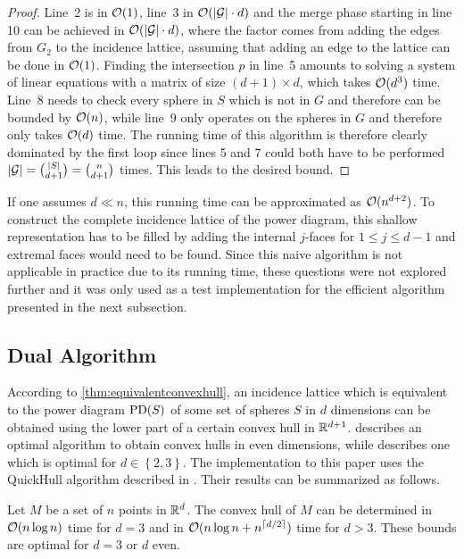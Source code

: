 \begin{proof}
    Line~2 is in $\mathcal{O}(1)$, line~3 in $\mathcal{O}(\left\vert \mathcal{G} \right\vert \cdot d)$ and the merge phase starting in line 10 can be achieved in $\mathcal{O}(\left\vert \mathcal{G} \right\vert \cdot d)$, where the factor comes from adding the edges from $G_2$ to the incidence lattice, assuming that adding an edge to the lattice can be done in $\mathcal{O}(1)$.
    Finding the intersection $p$ in line~5 amounts to solving a system of linear equations with a matrix of size $(d+1) \times d$, which takes $\mathcal{O}(d^3)$ time.
    Line~8 needs to check every sphere in $S$ which is not in $G$ and therefore can be bounded by $\mathcal{O}(n)$, while line~9 only operates on the spheres in $G$ and therefore only takes $\mathcal{O}(d)$ time.
    The running time of this algorithm is therefore clearly dominated by the first loop since lines 5 and 7 could both have to be performed $\left\vert \mathcal{G} \right\vert = \binom{\left\vert S \right\vert}{d + 1} = \binom{n}{d + 1}$ times.
    This leads to the desired bound.
\end{proof}

If one assumes $d \ll n$, this running time can be approximated as $\mathcal{O}(n^{d+2})$.
To construct the complete incidence lattice of the power diagram, this shallow representation has to be filled by adding the internal $j$-faces for $1 \leq j \leq d -1$ and extremal faces would need to be found.
Since this naive algorithm is not applicable in practice due to its running time, these questions were not explored further and it was only used as a test implementation for the efficient algorithm presented in the next subsection.

\subsection{Dual Algorithm}
\label{sub:dual_algorithm}
According to \cref{thm:equivalentconvexhull}, an incidence lattice which is equivalent to the power diagram $\operatorname{PD}(S)$ of some set of spheres $S$ in $d$ dimensions can be obtained using the lower part of a certain convex hull in $\mathbb{R}^{d+1}$.
\cite{seidel1981convex} describes an optimal algorithm to obtain convex hulls in even dimensions, while \cite{preparata1977convex} describes one which is optimal for $d \in \left\{ 2, 3 \right\}$.
The implementation to this paper uses the QuickHull algorithm described in \cite{barber1996quickhull}.
Their results can be summarized as follows.
\begin{lemma}
    \label{lem:convexhulls}
    Let $M$ be a set of $n$ points in $\mathbb{R}^d$.
    The convex hull of $M$ can be determined in $\mathcal{O}(n \log n)$ time for $d = 3$ and in $\mathcal{O}(n \log n + n^{\left\lceil d/2\right\rceil})$ time for $d > 3$.
    These bounds are optimal for $d = 3$ or $d$ even.
\end{lemma}


